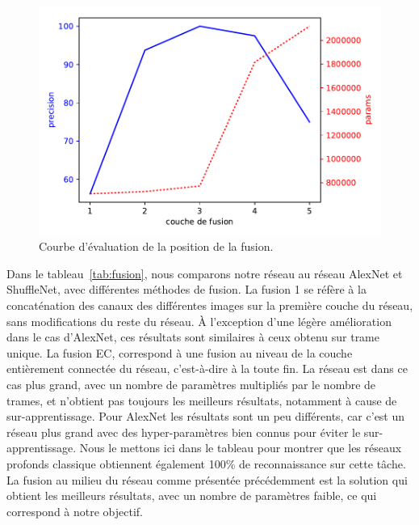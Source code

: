 \begin{figure}
\centering
\includegraphics[width=\columnwidth]{figures/precisionFusion.pdf}
\caption{Courbe d'évaluation de la position de la fusion.}%
\label{fig:FusionLayer}%
\end{figure}

Dans le tableau~\ref{tab:fusion}, nous comparons notre réseau au réseau AlexNet et ShuffleNet, avec différentes méthodes de fusion.
La fusion 1 se réfère à la concaténation des canaux des différentes images sur la première couche du réseau, sans modifications du reste du réseau.
À l'exception d'une légère amélioration dans le cas d'AlexNet, ces résultats sont similaires à ceux obtenu sur trame unique.
La fusion EC, correspond à une fusion au niveau de la couche entièrement connectée du réseau, c'est-à-dire à la toute fin.
La réseau est dans ce cas plus grand, avec un nombre de paramètres multipliés par le nombre de trames, et n'obtient pas toujours les meilleurs résultats, notamment à cause de sur-apprentissage.
Pour AlexNet les résultats sont un peu différents, car c'est un réseau plus grand avec des hyper-paramètres bien connus pour éviter le sur-apprentissage. 
Nous le mettons ici dans le tableau pour montrer que les réseaux profonds classique obtiennent également 100\% de reconnaissance sur cette tâche.
La fusion au milieu du réseau comme présentée précédemment est la solution qui obtient les meilleurs résultats, avec un nombre de paramètres faible, ce qui correspond à notre objectif.
 

